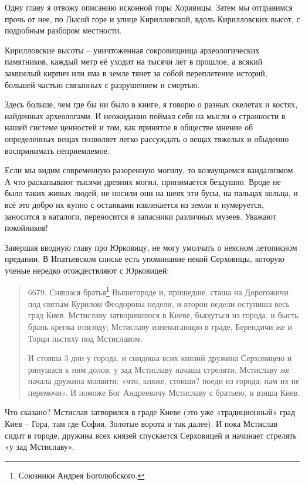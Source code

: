 Одну главу я отвожу описанию исконной горы Хоривицы. Затем мы отправимся прочь от нее, по Лысой горе и улице Кирилловской, вдоль Кирилловских высот, с подробным разбором местности. 

Кирилловские высоты – уничтоженная сокровищница археологических памятников, каждый метр её уходит на тысячи лет в прошлое, а всякий замшелый кирпич или яма в земле тянет за собой переплетение историй, большей частью связанных с разрушением и смертью.

Здесь больше, чем где бы ни было в книге, я говорю о разных скелетах и костях, найденных археологами. И неожиданно поймал себя на мысли о странности в нашей системе ценностей и том, как принятое в обществе мнение об определенных вещах позволяет легко рассуждать о вещах тяжелых и обыденно воспринимать неприемлемое.

Если мы видим современную разоренную могилу, то возмущаемся вандализмом. А что раскапывают тысячи древних могил, принимается бездушно. Вроде не было таких живых людей, не носили они на шеях эти бусы, на пальцах кольца, и всё это добро их купно с останками извлекается из земли и нумеруется, заносится в каталоги, переносится в запасники различных музеев. Уважают покойников!

Завершая вводную главу про Юрковицу, не могу умолчать о неясном летописном предании. В Ипатьевском списке есть упоминание некой Серховицы, которую ученые нередко отождествляют с Юрковицей:

\begin{quotation}
6679. Сняшася братья\footnote{Союзники Андрея Боголюбского.} Вышегороде и, пришедше, сташа на Дорогожичи под святым Курилом Феодоровы недели, и второи недели оступиша весь град Киев. Мстиславу затворившюся в Киеве, бьяхуться из города, и бысть брань крепка отвсюду; Мстиславу изнемагающю в граде, Берендичи же и Торци льстяху под Мстиславом. 

И стояша 3 дни у города, и снидоша всих князий дружина Серховицею и ринушася к ним долов, у зад Мстиславу начаша стреляти. Мстиславу же начала дружина молвити: «что, княже, стоиши? поеди из города; нам их не перемочи». И поможе Бог Андреевичу Мстиславу с братьею, и взяша Киев.
\end{quotation}

Что сказано? Мстислав затворился в граде Киеве (это уже «традиционный» град Киев – Гора, там где София, Золотые ворота и так далее). И пока Мстислав сидит в городе, дружина всех князей спускается Серховицей и начинает стрелять «у зад Мстиславу».

